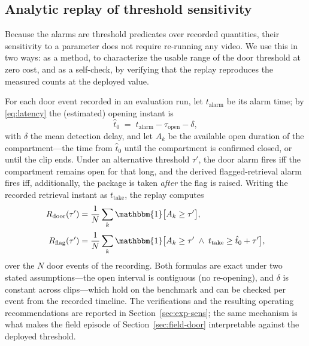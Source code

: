 \documentclass[journal,article,submit,oneauthor]{Definitions/mdpi}
\begin{document}
\subsection{Analytic replay of threshold sensitivity}
\label{sec:replay}
Because the alarms are threshold predicates over recorded quantities, their sensitivity to a
parameter does not require re-running any video. We use this in two ways: as a method, to
characterize the usable range of the door threshold at zero cost, and as a self-check, by
verifying that the replay reproduces the measured counts at the deployed value.

For each door event recorded in an evaluation run, let $t_{\mathrm{alarm}}$ be its alarm
time; by \eqref{eq:latency} the (estimated) opening instant is
\begin{equation}
\label{eq:replay-open}
\hat{t}_0 \;=\; t_{\mathrm{alarm}} - \tau_{\mathrm{open}} - \delta,
\end{equation}
with $\delta$ the mean detection delay, and let $A_k$ be the available open duration of the
compartment---the time from $\hat{t}_0$ until the compartment is confirmed closed, or until
the clip ends. Under an alternative threshold $\tau'$, the door alarm fires iff the
compartment remains open for that long, and the derived flagged-retrieval alarm fires iff,
additionally, the package is taken \emph{after} the flag is raised. Writing the recorded
retrieval instant as $t_{\mathrm{take}}$, the replay computes
\begin{align}
R_{\mathrm{door}}(\tau') &= \frac{1}{N}\sum_{k}
   \mathbbm{1}\bigl[A_k \ge \tau'\bigr],
\label{eq:replay-door}\\[2pt]
R_{\mathrm{flag}}(\tau') &= \frac{1}{N}\sum_{k}
   \mathbbm{1}\bigl[A_k \ge \tau' \;\wedge\;
   t_{\mathrm{take}} \ge \hat{t}_0 + \tau'\bigr],
\label{eq:replay-flag}
\end{align}
over the $N$ door events of the recording. Both formulas are exact under two stated
assumptions---the open interval is contiguous (no re-opening), and $\delta$ is constant
across clips---which hold on the benchmark and can be checked per event from the recorded
timeline. The verifications and the resulting operating recommendations are reported in
Section~\ref{sec:exp-sens}; the same mechanism is what makes the field episode of
Section~\ref{sec:field-door} interpretable against the deployed threshold.
\end{document}

